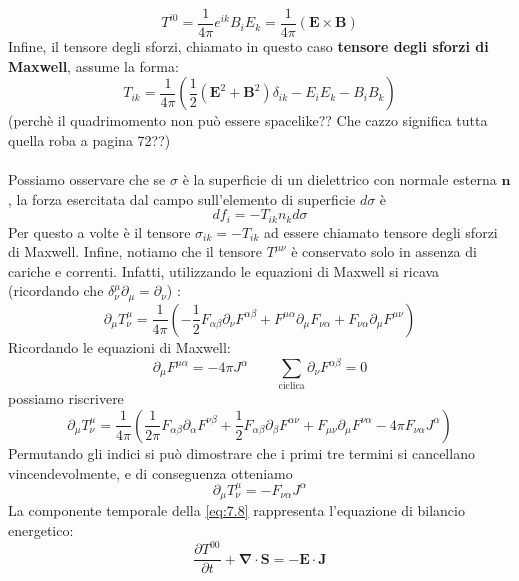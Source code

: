 \documentclass[a4paper,11pt]{book}
\theoremstyle{plain}
\theoremstyle{definition}
\begin{document}
\[
T^{i0} = \frac{1}{4\pi} e^{ik}B_iE_k = \frac{1}{4\pi}(\textbf{E}\times \textbf{B})
\]
Infine, il tensore degli sforzi, chiamato in questo caso \textbf{tensore degli sforzi di Maxwell}, assume la forma:
\[
T_{ik} = \frac{1}{4\pi}\left( \frac{1}{2}(\textbf{E}^2+\textbf{B}^2)\delta_{ik}-E_iE_k-B_iB_k \right)
\]
(perchè il quadrimomento non può essere spacelike?? Che cazzo significa tutta quella roba a pagina 72??) \\ \\
Possiamo osservare che se $\sigma$ è la superficie di un dielettrico con normale esterna $\textbf{n}$, la forza esercitata dal campo sull'elemento di superficie $d\sigma$ è
\[
df_i = -T_{ik}n_kd\sigma
\]
Per questo a volte è il tensore $\sigma_{ik}=-T_{ik}$ ad essere chiamato tensore degli sforzi di Maxwell. Infine, notiamo che il tensore $T^{\mu\nu}$ è conservato solo in assenza di cariche e correnti. Infatti, utilizzando le equazioni di Maxwell si ricava (ricordando che $\delta^{\mu}_{\nu}\partial_{\mu} = \partial_{\nu}$) :
\[
\partial_{\mu}T^{\mu}_{\nu} = \frac{1}{4\pi}\left( -\frac{1}{2}F_{\alpha\beta}\partial_{\nu}F^{\alpha\beta}+F^{\mu\alpha}\partial_{\mu}F_{\nu\alpha}+F_{\nu\alpha}\partial_{\mu} F^{\mu\nu} \right) 
\]
Ricordando le equazioni di Maxwell:
\[
\partial_{\mu}F^{\mu\alpha} = -4\pi J^{\alpha} \qquad \sum_{\text{ciclica}} \partial_{\nu}F^{\alpha\beta} = 0
\]
possiamo riscrivere
\[
\partial_{\mu}T_{\nu}^{\mu} = \frac{1}{4\pi} \left( \frac{1}{2\pi}F_{\alpha\beta}\partial_{\alpha}F^{\nu\beta}+\frac{1}{2}F_{\alpha\beta}\partial_{\beta}F^{\alpha\nu}+F_{\mu\nu}\partial_{\mu}F^{\nu\alpha}-4\pi F_{\nu\alpha}J^{\alpha} \right)
\]
Permutando gli indici si può dimostrare che i primi tre termini si cancellano vincendevolmente, e di conseguenza otteniamo
\begin{equation}\label{eq:7.8}
\partial_{\mu}T^{\mu}_{\nu} = -F_{\nu\alpha}J^{\alpha}
\end{equation}
La componente temporale della \eqref{eq:7.8} rappresenta l'equazione di bilancio energetico:
\[
\frac{\partial T^{00}}{\partial t}+\boldsymbol{\nabla}\cdot \textbf{S}=-\textbf{E}\cdot \textbf{J}
\]
\end{document}
